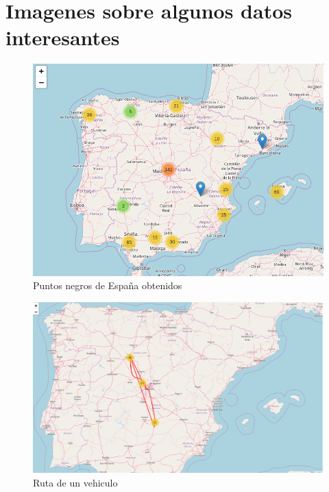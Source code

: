 \chapter{Imagenes sobre algunos datos interesantes}\label{apend.A}


\begin{figure}[htp]
\centering
\includegraphics[scale=.50]{Anexos/PuntosNegrosEspana.png}
\caption{Puntos negros de España obtenidos}
\label{blackShapes}
\end{figure}

\begin{figure}[htp]
\centering
\includegraphics[scale=.30]{Anexos/rutaDeUnVehiculo.png}
\caption{Ruta de un vehiculo}
\label{littleRoute}
\end{figure}


